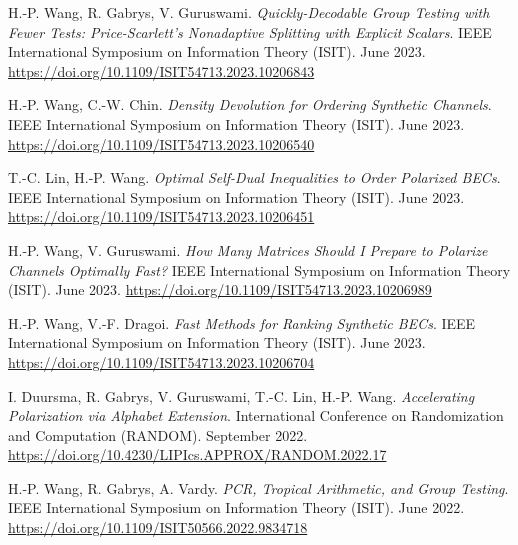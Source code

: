 \documentclass{article}
\def\sec#1{\vskip1em\textbf{\fs1#1}}
\def\fs#1{%
        \pgfmathsetmacro\a{#1}%
        \pgfmathsetmacro\A{\parskip*(4/3)^\a}%
        \pgfmathsetmacro\B{\A*(4/3)}%
        \fontsize{\A pt}{\B pt}\selectfont%
    }
\def\newtoold{\mdseries (new to old)}
\begin{document}
\bgroup
\def\section#1#2{\sec{Peer-Reviewed Conference Publications \newtoold}}
\begin{thebibliography}{C9}
    H.-P. Wang, R. Gabrys, V. Guruswami.
    \emph{Quickly-Decodable Group Testing with Fewer Tests:
    Price-Scarlett's Nonadaptive Splitting with Explicit Scalars}.
    IEEE International Symposium on Information Theory (ISIT).
    June 2023.
    \url{https://doi.org/10.1109/ISIT54713.2023.10206843}

    H.-P. Wang, C.-W. Chin.
    \emph{Density Devolution for Ordering Synthetic Channels}.
    IEEE International Symposium on Information Theory (ISIT).
    June 2023.
    \url{https://doi.org/10.1109/ISIT54713.2023.10206540}

    T.-C. Lin, H.-P. Wang.
    \emph{Optimal Self-Dual Inequalities to Order Polarized BECs}.
    IEEE International Symposium on Information Theory (ISIT).
    June 2023.
    \url{https://doi.org/10.1109/ISIT54713.2023.10206451}
    
    H.-P. Wang, V. Guruswami.
    \emph{How Many Matrices Should I Prepare to Polarize Channels
    Optimally Fast?}
    IEEE International Symposium on Information Theory (ISIT).
    June 2023.
    \url{https://doi.org/10.1109/ISIT54713.2023.10206989}

    H.-P. Wang, V.-F. Dragoi.
    \emph{Fast Methods for Ranking Synthetic BECs}.
    IEEE International Symposium on Information Theory (ISIT).
    June 2023.
    \url{https://doi.org/10.1109/ISIT54713.2023.10206704}

    I. Duursma, R. Gabrys, V. Guruswami, T.-C. Lin, H.-P. Wang.
    \emph{Accelerating Polarization via Alphabet Extension}.
    International Conference on Randomization and Computation (RANDOM).
    September 2022.
    \url{https://doi.org/10.4230/LIPIcs.APPROX/RANDOM.2022.17}

    H.-P. Wang, R. Gabrys, A. Vardy.
    \emph{PCR, Tropical Arithmetic, and Group Testing}.
    IEEE International Symposium on Information Theory (ISIT).
    June 2022.
\url{https://doi.org/10.1109/ISIT50566.2022.9834718}
\end{thebibliography}
\egroup
\end{document}
